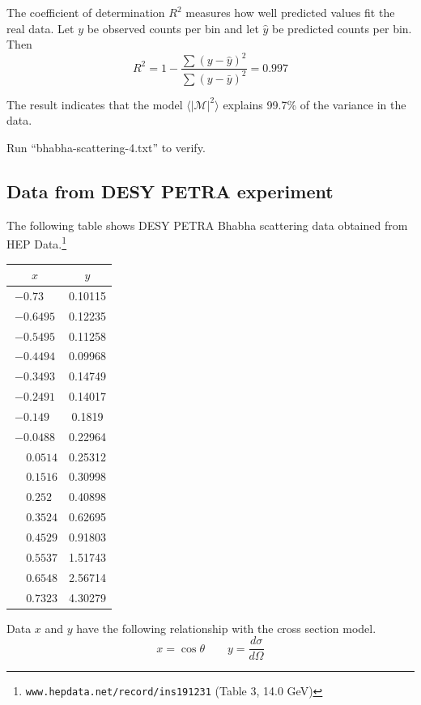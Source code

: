 \documentclass[12pt]{article}
\begin{document}
\noindent
The coefficient of determination $R^2$ measures how well predicted values fit the real data.
Let $y$ be observed counts per bin and let $\hat{y}$ be predicted counts per bin.
Then
\begin{equation*}
R^2=1-\frac{\sum(y-\hat{y})^2}{\sum(y-\bar{y})^2}=0.997
\end{equation*}

\noindent
The result indicates that the model $\langle|\mathcal{M}|^2\rangle$ explains
99.7\% of the variance in the data.

\bigskip
\noindent
Run ``bhabha-scattering-4.txt'' to verify.

\subsection*{Data from DESY PETRA experiment}
The following table shows DESY PETRA Bhabha scattering data obtained from
HEP Data.\footnote{{\tt www.hepdata.net/record/ins191231} (Table 3, 14.0 GeV)}

\begin{center}
\begin{tabular}{|c|c|}
\hline
$x$ & $y$\\
\hline
$-0.73\phantom{00}$ & 0.10115\\
$-0.6495$ & 0.12235\\
$-0.5495$ & 0.11258\\
$-0.4494$ & 0.09968\\
$-0.3493$ & 0.14749\\
$-0.2491$ & 0.14017\\
$-0.149\phantom{0}$ & 0.1819\phantom{0}\\
$-0.0488$ & 0.22964\\
$\phantom{+}0.0514$ & 0.25312\\
$\phantom{+}0.1516$ & 0.30998\\
$\phantom{+}0.252\phantom{0}$ & 0.40898\\
$\phantom{+}0.3524$ & 0.62695\\
$\phantom{+}0.4529$ & 0.91803\\
$\phantom{+}0.5537$ & 1.51743\\
$\phantom{+}0.6548$ & 2.56714\\
$\phantom{+}0.7323$ & 4.30279\\
\hline
\end{tabular}
\end{center}

\noindent
Data $x$ and $y$ have the following relationship
with the cross section model.
\begin{equation*}
x=\cos\theta
\qquad
y=\frac{d\sigma}{d\Omega}
\end{equation*}
\end{document}
